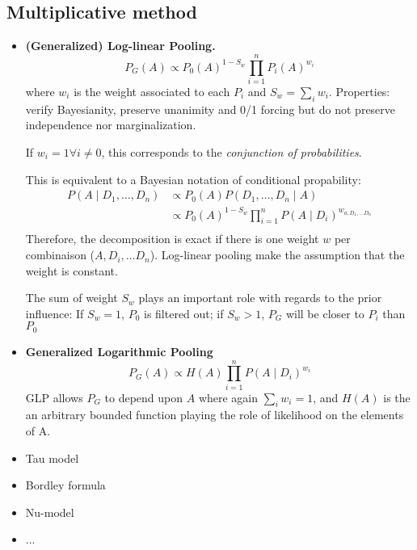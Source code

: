 \documentclass[twocolumn]{article}
\numberwithin{equation}{section}
\begin{document}
	\subsection{Multiplicative method}
\begin{itemize}
	\item \textbf{(Generalized) Log-linear Pooling.} 
$$P_G(A) \propto P_0(A)^{1-S_w} \prod_{i=1}^n P_i(A)^{w_i}$$
where $w_i$ is the weight associated to each $P_i$ and $S_w=\sum_i w_i$.
Properties: verify Bayesianity, preserve unanimity and  0/1 forcing but do not preserve independence nor marginalization.

If $w_i=1 \forall i \neq 0$, this corresponds to the \textit{conjunction of probabilities}.

This is equivalent to a Bayesian notation of conditional propability:
\begin{align*} 
P(A \mid D_1,\ldots,D_n)	& \propto P_0(A) P(D_1,\ldots,D_n\mid A)\\ 
						& \propto P_0(A)^{1-S_w} \prod_{i=1}^n P(A \mid D_i)^{w_{a,D_1,\ldots D_n}}\\ 
\end{align*}
Therefore, the decomposition is exact if there is one weight $w$ per combinaison ($A,D_i,\ldots D_n$). Log-linear pooling make the assumption that the weight is constant.

The sum of weight $S_w$ plays an important role with regards to the prior influence: If $S_w=1$, $P_0$ is filtered out; if $S_w>1$, $P_G$ will be closer to $P_i$ than $P_0$


	\item \textbf{Generalized Logarithmic Pooling}
$$P_G(A) \propto H(A) \prod_{i=1}^n P(A \mid D_i)^{w_i}$$
GLP allows $P_G$ to depend upon $A$ where again $\sum_i w_i=1$, and $H(A)$ is the an arbitrary bounded function playing the role of likelihood on the elements of A.
\end{itemize}

\begin{itemize}
	\item Tau model
	\item Bordley formula
	\item Nu-model
	\item ...
\end{itemize}




	
	
\end{document}
